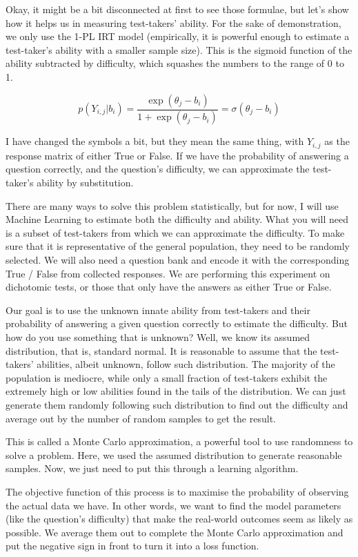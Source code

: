 \documentclass{article}
\begin{document}
Okay, it might be a bit disconnected at first to see those formulae, but let’s show how it helps us in measuring test-takers’ ability. For the sake of demonstration, we only use the 1-PL IRT model (empirically, it is powerful enough to estimate a test-taker’s ability with a smaller sample size). This is the sigmoid function of the ability subtracted by difficulty, which squashes the numbers to the range of 0 to 1.

\[
p\left(Y_{i,j}|b_i\right)=\frac{\exp(\theta_j-b_i)}{1+\exp(\theta_j-b_i)}=\sigma(\theta_j-b_i)
\]

I have changed the symbols a bit, but they mean the same thing, with $Y_{i,j}$ as the response matrix of either True or False. If we have the probability of answering a question correctly, and the question’s difficulty, we can approximate the test-taker’s ability by substitution.

There are many ways to solve this problem statistically, but for now, I will use Machine Learning to estimate both the difficulty and ability. What you will need is a subset of test-takers from which we can approximate the difficulty. To make sure that it is representative of the general population, they need to be randomly selected. We will also need a question bank and encode it with the corresponding True / False from collected responses. We are performing this experiment on dichotomic tests, or those that only have the answers as either True or False.

Our goal is to use the unknown innate ability from test-takers and their probability of answering a given question correctly to estimate the difficulty. But how do you use something that is unknown? Well, we know its assumed distribution, that is, standard normal. It is reasonable to assume that the test-takers' abilities, albeit unknown, follow such distribution. The majority of the population is mediocre, while only a small fraction of test-takers exhibit the extremely high or low abilities found in the tails of the distribution. We can just generate them randomly following such distribution to find out the difficulty and average out by the number of random samples to get the result.

This is called a Monte Carlo approximation, a powerful tool to use randomness to solve a problem. Here, we used the assumed distribution to generate reasonable samples. Now, we just need to put this through a learning algorithm.

The objective function of this process is to maximise the probability of observing the actual data we have. In other words, we want to find the model parameters (like the question's difficulty) that make the real-world outcomes seem as likely as possible. We average them out to complete the Monte Carlo approximation and put the negative sign in front to turn it into a loss function.
\end{document}
